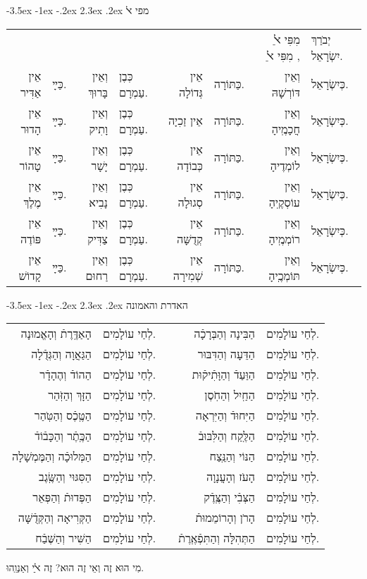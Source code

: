 \documentclass[12pt,letterpaper]{siddur}
\makeatletter
\renewcommand\section{\setcounter{mishnah}{0}\@startsection {section}{1}{\z@}%
                                   {-3.5ex \@plus -1ex \@minus -.2ex}%
                                   {2.3ex \@plus.2ex}%
                                   {\normalfont\large}}
\makeatother
\begin{document}
\section{מפי ﭏ}
\begin{longtable}[r]{r l r l r l r l}
\hbox{}&&&&&&
מִפִּי ﭏֵ מִפִּי ﭏֵ ,&יְבֺרַךְ יִשְׂרָאֵל.\\
אֵין אַדִּיר&כַּײָ.&וְאֵין בָּרוּךְ&כְּבֶן עַמְרָם.&אֵין גְּדוֹלָה&כַּתּוֹרָה.&וְאֵין דּוֹרְשָׁהּ&כְּיִשְׂרָאֵל.\\
אֵין הָדוּר&כַּײָ.&וְאֵין וָתִיק&כְּבֶן עַמְרָם.&אֵין זַכִיָה&כַּתּוֹרָה.&וְאֵין חֲכָמֶֽיהָ&כְּיִשְׂרָאֵל.\\
אֵין טָהוֹר&כַּײָ.&וְאֵין יָשָׁר&כְּבֶן עַמְרָם.&אֵין כְּבוֹדָה&כַּתּוֹרָה.&וְאֵין לוֹמְדֶיהָ&כְּיִשְׂרָאֵל.\\
אֵין מֶלֶךְ&כַּײָ.&וְאֵין נָבִיא&כְּבֶן עַמְרָם.&אֵין סְגוּלָה&כַּתּוֹרָה.&וְאֵין עוֹסְקֶֽיהָ&כְּיִשְׂרָאֵל.\\
אֵין פּוֹדֶה&כַּײָ.&וְאֵין צַדִּיק&כְּבֶן עַמְרָם.&אֵין קְדֻשָּׁה&כַּתוֹרָה.&וְאֵין רוֹמְמֶֽיהָ&כְּיִשְׂרָאֵל.\\
אֵין קָדוֹשׁ&כַּײָ.&וְאֵין רַחוּם&כְּבֶן עַמְרָם.&אֵין שְׁמִירָה&כַּתּוֹרָה.&וְאֵין תּוֹמְכֶֽיהָ&כְּיִשְׂרָאֵל.
\end{longtable}
\section{האדרת והאמונה}
\begin{longtable}[r]{r l c r l}
הָאַדֶּֽרֶתֿ וְהָאֱמוּנָה&לְחַי עוֹלָמִים.&\hskip 0.3em\hbox{}&
הַבִּינָה וְהַבְּרָכָֿה&לְחַי עוֹלָמִים.\\
הַגַּאֲוָה וְהַגְּדֻֿלָה&לְחַי עוֹלָמִים.&&
הַדֵּעָה וְהַדִּבּוּר&לְחַי עוֹלָמִים.\\
הַהוֹדֿ וְהֶהָדָֿר&לְחַי עוֹלָמִים.&&
הַוַּעַדֿ וְהַוָּתִֿיקֿוּת&לְחַי עוֹלָמִים.\\
הַזָּךְ וְהַזֹּֽהַר&לְחַי עוֹלָמִים.&&
הַחַֽיִל וְהַחֹֽסֶן&לְחַי עוֹלָמִים.\\
הַטֶּֽכֶֿס וְהַטֹּֽהַר&לְחַי עוֹלָמִים.&&
הַיִּחוּדֿ וְהַיִּרְאָה&לְחַי עוֹלָמִים.\\
הַכֶּֽתֶֿר וְהַכָּבֿוֹדֿ&לְחַי עוֹלָמִים.&&
הַלֶּֽקַח וְהַלִּבּוּבֿ&לְחַי עוֹלָמִים.\\
הַמְּלוּכָֿה וְהַמֶּמְשָׁלָה&לְחַי עוֹלָמִים.&&
הַנּוֹי וְהַנֵּֽצַח&לְחַי עוֹלָמִים.\\
הַסִּגּוּי וְהַשֶּֽׂגֶב&לְחַי עוֹלָמִים.&&
הָעֹז וְהָעֲנָוָה&לְחַי עוֹלָמִים.\\
הַפְּדוּתֿ וְהַפְּאֵר&לְחַי עוֹלָמִים.&&
הַצְּבִֿי וְהַצֶּֽדֶֿק&לְחַי עוֹלָמִים.\\
הַקְּרִיאָה וְהַקְּדֻֿשָּׁה&לְחַי עוֹלָמִים.&&
הָרֹן וְהָרוֹמֵמוּתֿ&לְחַי עוֹלָמִים.\\
הַשִּׁיר וְהַשֶּׁבַֿח&לְחַי עוֹלָמִים.&&
הַתְּהִלָּה וְהַתִּפְֿאֶֽרֶתֿ&לְחַי עוֹלָמִים.
\end{longtable}\noindent
מִי הוּא זֶה וְאֵי זֶה הוּא? זֶה ﭏִֵי וְאַנְוֵֽהוּ.
\end{document}
